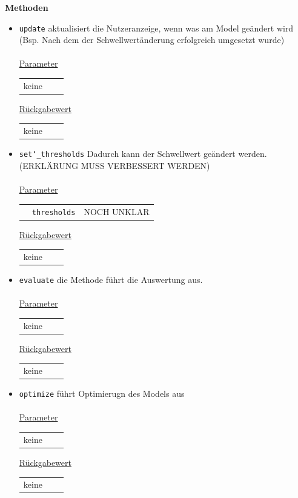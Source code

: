 \documentclass{article}
\begin{document}
\textbf{{Methoden}}
\begin{itemize}
\item \texttt{update} \newline aktualisiert die Nutzeranzeige, wenn was am Model geändert wird (Bsp. Nach dem der Schwellwertänderung erfolgreich umgesetzt wurde)
\\\\
\underline{{Parameter}} 
\begin{tabular}{lll}
keine
\end{tabular}

\underline{{Rückgabewert}}
\begin{tabular}{lll}
keine
\end{tabular}

\item \texttt{set\char`_thresholds} Dadurch kann der Schwellwert geändert werden. (ERKLÄRUNG MUSS VERBESSERT WERDEN) \newline 
\\\\
\underline{{Parameter}} 
\begin{tabular}{lll}
 & \texttt{thresholds} & NOCH UNKLAR \\
\end{tabular}

\underline{{Rückgabewert}}
\begin{tabular}{lll}
keine
\end{tabular}

\item \texttt{evaluate} \newline die Methode führt die Auswertung aus.
\\\\
\underline{{Parameter}} 
\begin{tabular}{lll}
keine
\end{tabular}

\underline{{Rückgabewert}}
\begin{tabular}{lll}
keine
\end{tabular}

\item \texttt{optimize} \newline führt Optimierugn des Models aus
\\\\
\underline{{Parameter}} 
\begin{tabular}{lll}
keine
\end{tabular}

\underline{{Rückgabewert}}
\begin{tabular}{lll}
keine
\end{tabular}


\end{itemize}
\end{document}
